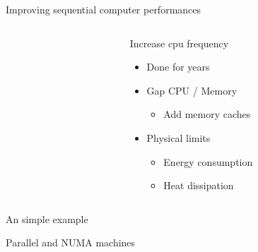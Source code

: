 \documentclass[xcolor={usenames,dvipsnames},hyperref={pdfusetitle}]{beamer}
\makeatletter
\newcommand{\alertitem}{\item<+-|alert@+>}
\makeatother
\begin{document}
\begin{frame}{Improving sequential computer performances}
    \begin{columns}
        \begin{column}{.45\textwidth}
            \centering
            
        \end{column}
        \begin{column}{.45\textwidth}
            \pause
            \begin{block}{Increase cpu frequency}
                \begin{itemize}[<+->]
                    \item Done for years
                    \alertitem Gap CPU / Memory
                    \begin{itemize}
                        \alertitem Add memory caches
                    \end{itemize}
                    \alertitem Physical limits
                        \begin{itemize}
                            \alertitem Energy consumption
                            \alertitem Heat dissipation
                        \end{itemize}
                \end{itemize}
            \end{block}
        \end{column}
    \end{columns}
\end{frame}

\begin{frame}{An simple example}
    \centering
    \scalebox{.6}{
        
    }
\end{frame}

\begin{frame}{Parallel and NUMA machines}
    \centering
    \scalebox{.6}{
        
    }
    \pause
\end{frame}
\end{document}
